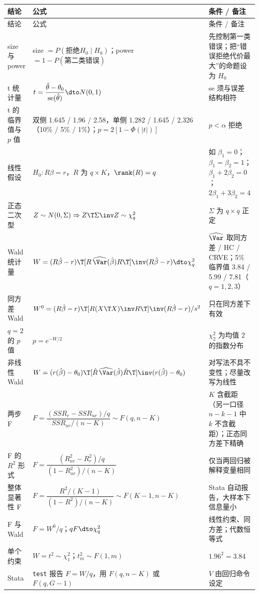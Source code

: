 {\small
\begin{longtable}{p{2.6cm}p{7.9cm}p{4.9cm}}
\toprule
结论 & 公式 & 条件 / 备注\\
\midrule
\endfirsthead
\toprule
结论 & 公式 & 条件 / 备注\\
\midrule
\endhead
\bottomrule
\endfoot
size 与 power & size $=P(\text{拒绝}H_0\mid H_0)$；power $=1-P(\text{第二类错误})$ & 先控制第一类错误；把“错误拒绝代价最大”的命题设为 $H_0$\\
t 统计量 & $t=\dfrac{\hat\theta-\theta_0}{\mathrm{se}(\hat\theta)}\dto N(0,1)$ & se 须与误差结构相符\\
t 的临界值与 $p$ 值 & 双侧 1.645 / 1.96 / 2.58，单侧 1.282 / 1.645 / 2.326（10\% / 5\% / 1\%）；$p=2[1-\Phi(|t|)]$ & $p<\alpha$ 拒绝\\
线性假设 & $H_0:R\beta=r$，$R$ 为 $q\times K$，$\rank(R)=q$ & 如 $\beta_1=0$；$\beta_1=\beta_2=1$；$\beta_1+2\beta_2=0$；$2\beta_1+3\beta_2=4$\\
正态二次型 & $Z\sim N(0,\Sigma)\Rightarrow Z\T\Sigma\inv Z\sim\chi^2_q$ & $\Sigma$ 为 $q\times q$ 正定\\
Wald 统计量 & $W=(R\hat\beta-r)\T[R\,\widehat{\Var}(\hat\beta)R\T]\inv(R\hat\beta-r)\dto\chi^2_q$ & $\widehat{\Var}$ 取同方差 / HC / CRVE；5\% 临界值 3.84 / 5.99 / 7.81（$q=1,2,3$）\\
同方差 Wald & $W^0=(R\hat\beta-r)\T[R(X\T X)\inv R\T]\inv(R\hat\beta-r)/s^2$ & 只在同方差下有效\\
$q=2$ 的 $p$ 值 & $p=e^{-W/2}$ & $\chi^2_2$ 为均值 2 的指数分布\\
非线性 Wald & $W=(r(\hat\beta)-\theta_0)\T[\hat R\,\widehat{\Var}(\hat\beta)\hat R\T]\inv(r(\hat\beta)-\theta_0)$ & 对写法不具不变性；尽量改写为线性\\
两步 F & $F=\dfrac{(SSR_r-SSR_{ur})/q}{SSR_{ur}/(n-K)}\sim F(q,n-K)$ & $K$ 含截距（另一口径 $n-k-1$ 中 $k$ 不含截距）；正态同方差下精确\\
F 的 $R^2$ 形式 & $F=\dfrac{(R^2_{ur}-R^2_r)/q}{(1-R^2_{ur})/(n-K)}$ & 仅当两回归被解释变量相同\\
整体显著性 F & $F=\dfrac{R^2/(K-1)}{(1-R^2)/(n-K)}\sim F(K-1,n-K)$ & Stata 自动报告，大样本下信息量小\\
F 与 Wald & $F=W^0/q$；$qF\dto\chi^2_q$ & 线性约束、同方差；代数恒等式\\
单个约束 & $W=t^2\sim\chi^2_1$；$t^2_m\sim F(1,m)$ & $1.96^2=3.84$\\
Stata & \texttt{test} 报告 $F=W/q$，用 $F(q,n-K)$ 或 $F(q,G-1)$ & $\hat V$ 由回归命令设定\\

\end{longtable}}
